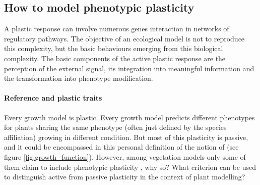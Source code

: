 {\subsection{How to model phenotypic plasticity}

A plastic response can involve numerous genes interaction in networks of regulatory pathways. The objective of an ecological model is not to reproduce this complexity, but the basic behaviours emerging from this biological complexity. The basic components of the active plastic response are the perception of the external signal, its integration into meaningful information and the transformation into phenotype modification.

\paragraph{Reference and plastic traits}

Every growth model is plastic. Every growth model predicts different phenotypes for plants sharing the same phenotype (often just defined by the species affiliation) growing in different condition. But most of this plasticity is passive, and it could be encompassed in this personal definition of the notion of  (see figure \ref{fig:growth_function}). However, among vegetation models only some of them claim to include phenotypic plasticity \parencite{maire_plasticity_2013}, why so? What criterion can be used to distinguish active from passive plasticity in the context of plant modelling?

}
